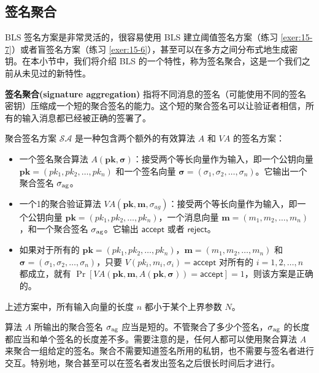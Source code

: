 \subsection{签名聚合}\label{subsec:15-5-2}

BLS 签名方案是非常灵活的，很容易使用 BLS 建立阈值签名方案（练习 \ref{exer:15-7}）或者盲签名方案（练习 \ref{exer:15-6}），甚至可以在多方之间分布式地生成密钥。在本小节中，我们将介绍 BLS 的一个特性，称为签名聚合，这是一个我们之前从未见过的新特性。

\textbf{签名聚合(signature aggregation)} 指将不同消息的签名（可能使用不同的签名密钥）压缩成一个短的聚合签名的能力。这个短的聚合签名可以让验证者相信，所有的输入消息都已经被正确的签署了。

\begin{definition}\label{def:15-4}
聚合签名方案 $\mathcal{S}\mathcal{A}$ 是一种包含两个额外的有效算法 $A$ 和 $\textit{VA}$ 的签名方案：
\begin{itemize}
	\item 一个签名聚合算法 $A(\boldsymbol{pk},\boldsymbol{\sigma})$：接受两个等长向量作为输入，即一个公钥向量 $\boldsymbol{pk}=(pk_1,pk_2,\dots,\allowbreak pk_n)$ 和一个签名向量 $\boldsymbol{\sigma}=(\sigma_1,\sigma_2,\dots,\sigma_n)$。它输出一个聚合签名 $\sigma_{\rm ag}$。
	\item 一个1的聚合验证算法 $\textit{VA}(\boldsymbol{pk},\boldsymbol{m},\sigma_{ag})$：接受两个等长向量作为输入，即一个公钥向量 $\boldsymbol{pk}=(pk_1,pk_2,\dots,pk_n)$，一个消息向量 $\boldsymbol{m}=(m_1, m_2, \dots, m_n)$，和一个聚合签名 $\sigma_{\rm ag}$。它输出 $\mathsf{accept}$ 或者 $\mathsf{reject}$。
	\item 如果对于所有的 $\boldsymbol{pk}=(pk_1,pk_2,\dots, pk_n)$，$\boldsymbol{m}=(m_1, m_2, \dots, m_n)$ 和 $\boldsymbol{\sigma}=(\sigma_1, \sigma_2, \dots, \sigma_n)$，只要 $V(pk_i,m_i,\sigma_i)=\mathsf{accept}$ 对所有的 $i=1,2,\dots,n$ 都成立，就有 $\Pr[\textit{VA}(\boldsymbol{pk},\boldsymbol{m},A(\boldsymbol{pk},\boldsymbol{\sigma}))=\mathsf{accept}]=1$，则该方案是正确的。
\end{itemize}
上述方案中，所有输入向量的长度 $n$ 都小于某个上界参数 $N$。
\end{definition}

算法 $A$ 所输出的聚合签名 $\sigma_{\rm ag}$ 应当是短的。不管聚合了多少个签名，$\sigma_{\rm ag}$ 的长度都应当和单个签名的长度差不多。需要注意的是，任何人都可以使用聚合算法 $A$ 来聚合一组给定的签名。聚合不需要知道签名所用的私钥，也不需要与签名者进行交互。特别地，聚合甚至可以在签名者发出签名之后很长时间后才进行。

